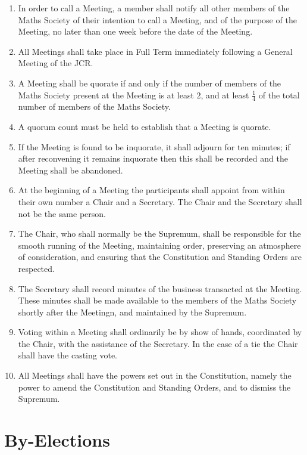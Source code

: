 \documentclass[pdftex,a4paper]{report}
\begin{document}
\begin{enumerate}[resume*]
	\item In order to call a Meeting, a member shall notify all other members of the Maths Society of their intention to call a Meeting, and of the purpose of the Meeting, no later than one week before the date of the Meeting.
	\item All Meetings shall take place in Full Term immediately following a General Meeting of the JCR.
	\item A Meeting shall be quorate if and only if the number of members of the Maths Society present at the Meeting is at least $2$, and at least $\frac{1}{4}$ of the total number of members of the Maths Society.
	\item A quorum count must be held to establish that a Meeting is quorate.
	\item If the Meeting is found to be inquorate, it shall adjourn for ten minutes; if after reconvening it remains inquorate then this shall be recorded and the Meeting shall be abandoned.
	\item At the beginning of a Meeting the participants shall appoint from within their own number a Chair and a Secretary. The Chair and the Secretary shall not be the same person.
	\item The Chair, who shall normally be the Supremum, shall be responsible for the smooth running of the Meeting, maintaining order, preserving an atmosphere of consideration, and ensuring that the Constitution and Standing Orders are respected.
	\item The Secretary shall record minutes of the business transacted at the Meeting. These minutes shall be made available to the members of the Maths Society shortly after the Meetingn, and maintained by the Supremum.
	\item Voting within a Meeting shall ordinarily be by show of hands, coordinated by the Chair, with the assistance of the Secretary. In the case of a tie the Chair shall have the casting vote.
	\item All Meetings shall have the powers set out in the Constitution, namely the power to amend the Constitution and Standing Orders, and to dismiss the Supremum.
\end{enumerate}


\section*{By-Elections}
\end{document}
